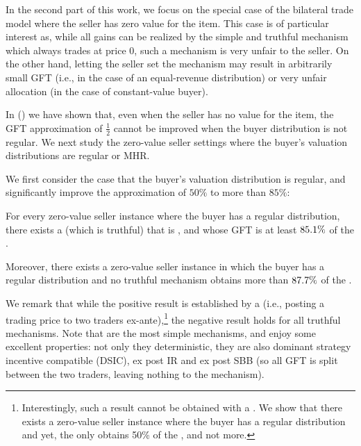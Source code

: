 In the second part of this work, we focus on the special case of the bilateral trade model where the seller has zero value for the item. This case is of particular interest as, while all gains can be realized by the simple and truthful mechanism which always trades at price $0$, such a mechanism is very unfair to the seller. On the other hand, letting the seller set the mechanism may result in arbitrarily small GFT (i.e., in the case of an equal-revenue distribution) or very unfair allocation (in the case of constant-value buyer).

In  () we have shown that, even when the seller has no value for the item, the GFT approximation of $\frac{1}{2}$ cannot be improved when the buyer distribution is not regular. We next study the zero-value seller settings where the buyer's valuation distributions are regular or MHR.


We first consider the case that the buyer's valuation distribution is regular, and significantly improve the approximation of $50\%$ to more than $85\%$: 
\begin{informal}
\label{infmthm:regular buyer}
    For every zero-value seller instance where the buyer has a regular distribution, there exists a {\FixPrice} (which is truthful) that is {\ksfair}, and whose GFT is at least ${85.1\%}$ of the {\SecondBest}.

    Moreover, there exists a zero-value seller instance in which the buyer has a regular distribution and no {\ksfair} truthful mechanism obtains more than ${87.7\%}$ of the {\SecondBest}. 
\end{informal}



We remark that while the positive result is established by a {\FixPrice} (i.e., posting a trading price to two traders ex-ante),\footnote{{Interestingly, such a result cannot be obtained with a {\BiasedRandomOffer}. We show that} there exists a zero-value seller instance where the buyer has a regular distribution and yet, the {\ksfair} {\BiasedRandomOffer} only obtains 50\% of the {\SecondBest}, and not more.} the negative result holds for all {\ksfair} truthful mechanisms. Note that {\FixPrices} are the most simple mechanisms, and enjoy some excellent properties: not only they deterministic, they are also dominant strategy incentive compatible (DSIC), ex post IR and ex post SBB (so all GFT is split between the two traders, leaving nothing to the mechanism).

